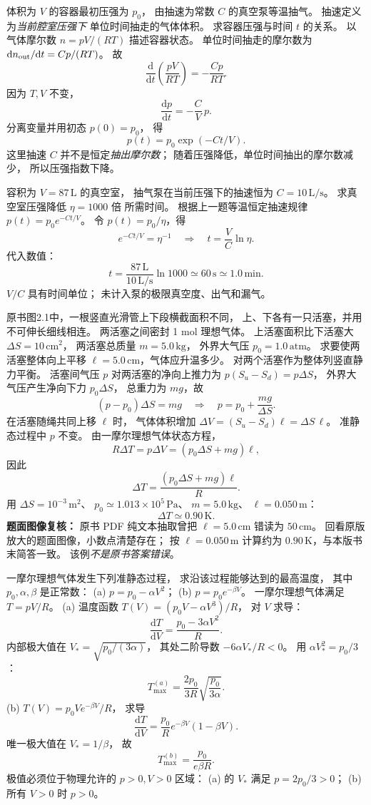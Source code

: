 体积为 $V$ 的容器最初压强为 $p_0$，
由抽速为常数 $C$ 的真空泵等温抽气。
抽速定义为\emph{当前腔室压强下}
单位时间抽走的气体体积。
求容器压强与时间 $t$ 的关系。
\exsolution
以气体摩尔数 $n=pV/(RT)$ 描述容器状态。
单位时间抽走的摩尔数为
$\mathrm d n_{\rm out}/\mathrm dt=Cp/(RT)$。
故
\[
\frac{\mathrm d}{\mathrm dt}\left(\frac{pV}{RT}\right)
=-\frac{Cp}{RT}.
\]
因为 $T,V$ 不变，
\[
\frac{\mathrm dp}{\mathrm dt}
=-\frac CV\,p.
\]
分离变量并用初态 $p(0)=p_0$，
得
\[
\boxed{p(t)=p_0\exp(-Ct/V)}.
\]
\excheck 这里抽速 $C$ 并不是恒定\emph{抽出摩尔数}；
随着压强降低，单位时间抽出的摩尔数减少，
所以压强指数下降。

容积为 $V=87\,\mathrm L$ 的真空室，
抽气泵在当前压强下的抽速恒为
$C=10\,\mathrm{L/s}$。
求真空室压强降低 $\eta=1000$ 倍
所需时间。
\exsolution
根据上一题等温恒定抽速规律
$p(t)=p_0e^{-Ct/V}$。
令 $p(t)=p_0/\eta$，得
\[
e^{-Ct/V}=\eta^{-1}
\quad\Longrightarrow\quad
\boxed{t=\frac VC\ln\eta}.
\]
代入数值：
\[
\boxed{t=\frac{87\,\mathrm L}{10\,\mathrm{L/s}}
\ln1000
\simeq60\,\mathrm s\simeq1.0\,\mathrm{min}}.
\]
\excheck $V/C$ 具有时间单位；
未计入泵的极限真空度、出气和漏气。

原书图2.1中，一根竖直光滑管上下段横截面积不同，
上、下各有一只活塞，并用不可伸长细线相连。
两活塞之间密封 1 mol 理想气体。
上活塞面积比下活塞大
$\Delta S=10\,\mathrm{cm^2}$，
两活塞总质量 $m=5.0\,\mathrm{kg}$，
外界大气压 $p_0=1.0\,\mathrm{atm}$。
求要使两活塞整体向上平移
$\ell=5.0\,\mathrm{cm}$，气体应升温多少。
\exsolution
对两个活塞作为整体列竖直静力平衡。
活塞间气压 $p$ 对两活塞的净向上推力为
$p(S_u-S_d)=p\Delta S$，
外界大气压产生净向下力 $p_0\Delta S$，
总重力为 $mg$，故
\[
(p-p_0)\Delta S=mg
\quad\Longrightarrow\quad
p=p_0+\frac{mg}{\Delta S}.
\]
在活塞随绳共同上移 $\ell$ 时，
气体体积增加
$\Delta V=(S_u-S_d)\ell=\Delta S\,\ell$。
准静态过程中 $p$ 不变。
由一摩尔理想气体状态方程，
\[
R\Delta T=p\Delta V
=(p_0\Delta S+mg)\ell,
\]
因此
\[
\boxed{\Delta T=\frac{(p_0\Delta S+mg)\ell}{R}}.
\]
用 $\Delta S=10^{-3}\,\mathrm{m^2}$、
$p_0\simeq1.013\times10^5\,\mathrm{Pa}$、
$m=5.0\,\mathrm{kg}$、
$\ell=0.050\,\mathrm m$：
\[
\boxed{\Delta T\simeq0.90\,\mathrm K}.
\]
\excheck \textbf{题面图像复核：}
原书 PDF 纯文本抽取曾把
$\ell=5.0\,\mathrm{cm}$ 错读为 $50\,\mathrm{cm}$。
回看原版放大的题面图像，小数点清楚存在；
按 $\ell=0.050\,\mathrm m$ 计算约为
$0.90\,\mathrm K$，与本版书末简答一致。
该例\emph{不是原书答案错误}。

一摩尔理想气体发生下列准静态过程，
求沿该过程能够达到的最高温度，
其中 $p_0,\alpha,\beta$ 是正常数：
(a) $p=p_0-\alpha V^2$；
(b) $p=p_0e^{-\beta V}$。
\exsolution
一摩尔理想气体满足
$T=pV/R$。
(a) 温度函数
$T(V)=(p_0V-\alpha V^3)/R$，
对 $V$ 求导：
\[
\frac{\mathrm dT}{\mathrm dV}
=\frac{p_0-3\alpha V^2}{R}.
\]
内部极大值在
$V_*=\sqrt{p_0/(3\alpha)}$，
其处二阶导数
$-6\alpha V_*/R<0$。
用
$\alpha V_*^2=p_0/3$：
\[
\boxed{T_{\max}^{(a)}
=\frac{2p_0}{3R}
\sqrt{\frac{p_0}{3\alpha}}}.
\]
(b) $T(V)=p_0Ve^{-\beta V}/R$，
求导
\[
\frac{\mathrm dT}{\mathrm dV}
=\frac{p_0}{R}e^{-\beta V}(1-\beta V).
\]
唯一极大值在 $V_*=1/\beta$，
故
\[
\boxed{T_{\max}^{(b)}
=\frac{p_0}{e\beta R}}.
\]
\excheck 极值必须位于物理允许的
$p>0,V>0$ 区域：
(a) 的 $V_*$ 满足 $p=2p_0/3>0$；
(b) 所有 $V>0$ 时 $p>0$。
